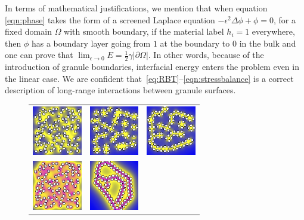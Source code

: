 In terms of mathematical justifications, we mention that when
equation \eqref{eqn:phase} takes the form of a screened Laplace equation
$-\epsilon^2 \Delta \phi + \phi =0$, for a fixed domain $\Omega$ with
smooth boundary, if the material label $h_i = 1$
everywhere, then $\phi$ has a boundary layer going from $1$ at the
boundary to $0$ in the bulk and one can prove that 
$\lim_{\epsilon \to 0} E = \frac{1}{2}\gamma |\partial \Omega|$.
In other words, because of the introduction of granule boundaries,
interfacial energy enters the problem even in the linear case.
We are confident
that~\eqref{eq:RBT}--\eqref{eqn:stressbalance} is a correct description
of long-range interactions between granule surfaces.

\begin{figure}
  \vspace{-15pt}
  \begin{center}
    \begin{tabular}{m{0.9in}m{0.9in}m{0.9in}}                 
    \includegraphics[width=0.85in]{figures/SpecificAim1/N100B1.jpg}
    &\includegraphics[width=0.85in]{figures/SpecificAim1/N100B2.jpg}
     &\includegraphics[width=0.85in]{figures/SpecificAim1/N100B3.jpg}    \\
    \includegraphics[width=0.85in]{figures/SpecificAim1/N100C1.jpg}
    &\includegraphics[width=0.85in]{figures/SpecificAim1/N100C2.jpg}

\end{tabular}
\end{center}
\end{figure}

